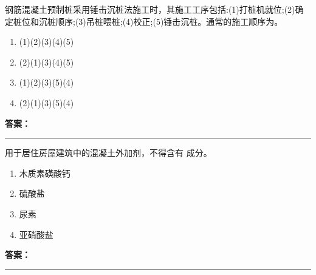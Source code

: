 \documentclass[UTF8,fontset=fandol,11pt]{ctexart}
\newcommand{\answerline}{\textcolor{answerred}{\rule{2.4cm}{0.7pt}}}
\begin{document}
\begin{quizbox}[title={乱序第 107 题｜第二章桩基础工程}]

钢筋混凝土预制桩采用锤击沉桩法施工时，其施工工序包括:(1)打桩机就位;(2)确定桩位和沉桩顺序;(3)吊桩喂桩;(4)校正;(5)锤击沉桩。通常的施工顺序为。\\

\begin{enumerate}[label=\Alph*.]

\item (1)(2)(3)(4)(5)

\item (2)(1)(3)(4)(5)

\item (1)(2)(3)(5)(4)

\item (2)(1)(3)(5)(4)

\end{enumerate}

\textbf{\textcolor{answerred}{答案：}} \answerline

\end{quizbox}

\vspace{0.2em}

\begin{quizbox}[title={乱序第 108 题｜第四章混凝土结构工程}]

用于居住房屋建筑中的混凝土外加剂，不得含有 成分。\\

\begin{enumerate}[label=\Alph*.]

\item 木质素磺酸钙

\item 硫酸盐

\item 尿素

\item 亚硝酸盐

\end{enumerate}

\textbf{\textcolor{answerred}{答案：}} \answerline

\end{quizbox}

\vspace{0.2em}
\end{document}
